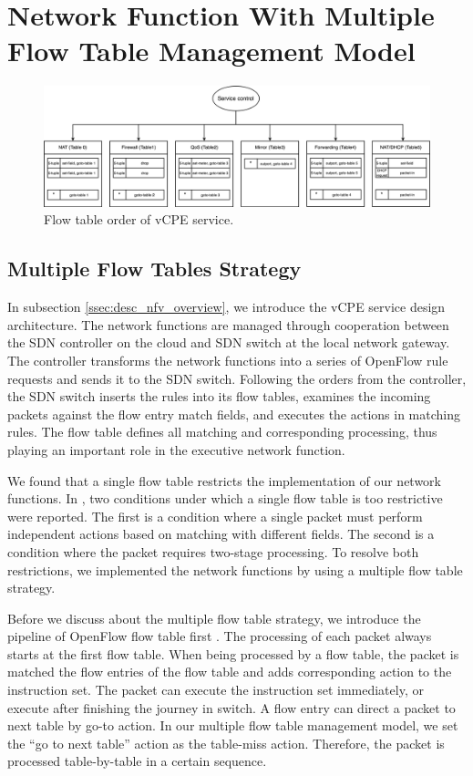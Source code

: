 \documentclass[conference]{IEEEtran}
\begin{document}
\section{Network Function With Multiple Flow Table Management Model} \label{sec:mft}

\begin{figure}[!t]
\centering
\includegraphics[width=\textwidth]{./figures/mft_table_overview}
\caption{Flow table order of vCPE service.}
\label{fig:mft_table_overview}
\end{figure}



\subsection{Multiple Flow Tables Strategy}
In subsection \ref{ssec:desc_nfv_overview}, we introduce the vCPE service design architecture. The network functions are managed through cooperation between the SDN controller on the cloud and SDN switch at the local network gateway. The controller transforms the network functions into a series of OpenFlow rule requests and sends it to the SDN switch. Following the orders from the controller, the SDN switch inserts the rules into its flow tables, examines the incoming packets against the flow entry match fields, and executes the actions in matching rules. The flow table \cite{sdn-ft} defines all matching and corresponding processing, thus playing an important role in the executive network function.

We found that a single flow table restricts the implementation of our network functions. In \cite{multiple-flow-table}, two conditions under which a single flow table is too restrictive were reported. The first is a condition where a single packet must perform independent actions based on matching with different fields. The second is a condition where the packet requires two-stage processing. To resolve both restrictions, we implemented the network functions by using a multiple flow table strategy.

Before we discuss about the multiple flow table strategy, we introduce the pipeline of OpenFlow flow table first \cite{openflow-spec}. The processing of each packet always starts at the first flow table. When being processed by a flow table, the packet is matched the flow entries of the flow table and adds corresponding action to the instruction set. The packet can execute the instruction set immediately, or execute after finishing the journey in switch. A flow entry can direct a packet to next table by go-to action. In our multiple flow table management model, we set the ``go to next table'' action as the table-miss action. Therefore, the packet is processed table-by-table in a certain sequence.
\end{document}
